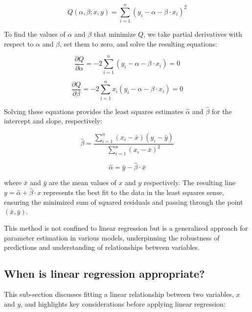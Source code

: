 \documentclass{article}
\begin{document}
\[
Q(\alpha, \beta; x, y) = \sum_{i=1}^{n} (y_i - \alpha - \beta \cdot x_i)^2
\]

To find the values of \( \alpha \) and \( \beta \) that minimize \( Q \), we take partial derivatives with respect to \( \alpha \) and \( \beta \), set them to zero, and solve the resulting equations:

\[
\frac{\partial Q}{\partial \alpha} = -2 \sum_{i=1}^{n} (y_i - \alpha - \beta \cdot x_i) = 0
\]

\[
\frac{\partial Q}{\partial \beta} = -2 \sum_{i=1}^{n} x_i (y_i - \alpha - \beta \cdot x_i) = 0
\]

Solving these equations provides the least squares estimates \( \hat{\alpha} \) and \( \hat{\beta} \) for the intercept and slope, respectively:

\[
\hat{\beta} = \frac{\sum_{i=1}^{n} (x_i - \bar{x})(y_i - \bar{y})}{\sum_{i=1}^{n} (x_i - \bar{x})^2}
\]

\[
\hat{\alpha} = \bar{y} - \hat{\beta} \cdot \bar{x}
\]

where \( \bar{x} \) and \( \bar{y} \) are the mean values of \( x \) and \( y \) respectively. The resulting line \( y = \hat{\alpha} + \hat{\beta} \cdot x \) represents the best fit to the data in the least squares sense, ensuring the minimized sum of squared residuals and passing through the point \( (\bar{x}, \bar{y}) \).

This method is not confined to linear regression but is a generalized approach for parameter estimation in various models, underpinning the robustness of predictions and understanding of relationships between variables.

\subsection{When is linear regression appropriate?}

This sub-section discusses fitting a linear relationship between two variables, $x$ and $y$, and highlights key considerations before applying linear regression:
\end{document}
